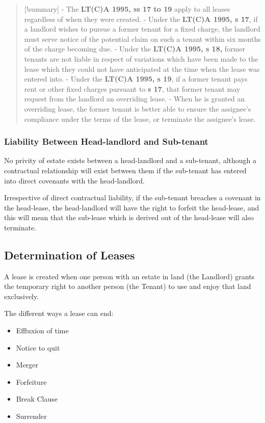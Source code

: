 \documentclass[
]{article}
\providecommand{\tightlist}{%
  \setlength{\itemsep}{0pt}\setlength{\parskip}{0pt}}
\begin{document}
\begin{quote}
{[}!summary{]} - The \textbf{LT(C)A 1995, ss 17 to 19} apply to all
leases regardless of when they were created. - Under the \textbf{LT(C)A
1995, s 17}, if a landlord wishes to pursue a former tenant for a fixed
charge, the landlord must serve notice of the potential claim on such a
tenant within six months of the charge becoming due. - Under the
\textbf{LT(C)A 1995, s 18,} former tenants are not liable in respect of
variations which have been made to the lease which they could not have
anticipated at the time when the lease was entered into. - Under the
\textbf{LT(C)A 1995, s 19}, if a former tenant pays rent or other fixed
charges pursuant to \textbf{s 17}, that former tenant may request from
the landlord an overriding lease. - When he is granted an overriding
lease, the former tenant is better able to ensure the assignee's
compliance under the terms of the lease, or terminate the assignee's
lease.
\end{quote}

\hypertarget{liability-between-head-landlord-and-sub-tenant}{%
\subsubsection{Liability Between Head-landlord and
Sub-tenant}\label{liability-between-head-landlord-and-sub-tenant}}

No privity of estate exists between a head-landlord and a sub-tenant,
although a contractual relationship will exist between them if the
sub-tenant has entered into direct covenants with the head-landlord.

Irrespective of direct contractual liability, if the sub-tenant breaches
a covenant in the head-lease, the head-landlord will have the right to
forfeit the head-lease, and this will mean that the sub-lease which is
derived out of the head-lease will also terminate.

\hypertarget{determination-of-leases}{%
\subsection{Determination of Leases}\label{determination-of-leases}}

A lease is created when one person with an estate in land (the Landlord)
grants the temporary right to another person (the Tenant) to use and
enjoy that land exclusively.

The different ways a lease can end:

\begin{itemize}
\tightlist
\item
  Effluxion of time
\item
  Notice to quit
\item
  Merger
\item
  Forfeiture
\item
  Break Clause
\item
  Surrender
\end{itemize}
\end{document}
